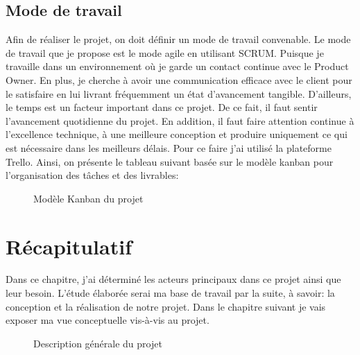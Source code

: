 \documentclass[a4paper]{report}
\begin{document}
\begin{doublespace}
	\subsection{Mode de travail}
	Afin de réaliser le projet, on doit définir un mode de travail convenable. Le mode de
	travail que je propose est le mode agile en utilisant SCRUM. Puisque je travaille
	dans un environnement où je garde un contact continue avec le Product Owner. En
	plus, je cherche à avoir une communication efficace avec le client pour le
	satisfaire en lui livrant fréquemment un état d'avancement tangible.
	D'ailleurs, le temps est un facteur important dans ce projet. De ce fait, il faut sentir
	l’avancement quotidienne du projet. En addition, il faut faire attention continue à
	l’excellence technique, à une meilleure conception et produire uniquement ce qui est
	nécessaire dans les meilleurs délais. Pour ce faire j'ai utilisé la plateforme Trello. Ainsi, on présente le tableau suivant basée sur le modèle kanban pour l'organisation des tâches et des livrables:
	\begin{figure}[H]
		\begin{center}
			\caption{Modèle Kanban du projet}
		\end{center}
	\end{figure}
	\section{Récapitulatif}
	Dans ce chapitre, j'ai déterminé les acteurs principaux dans ce projet ainsi que leur
	besoin. L'étude élaborée serai ma base de travail par la suite, à
	savoir: la conception et la réalisation de notre projet. Dans le chapitre suivant je vais
	exposer ma vue conceptuelle vis-à-vis au projet.
	\begin{figure}[H]
		\begin{center}
			\caption{Description générale du projet}
		\end{center}
	\end{figure}

\end{doublespace}
\end{document}
